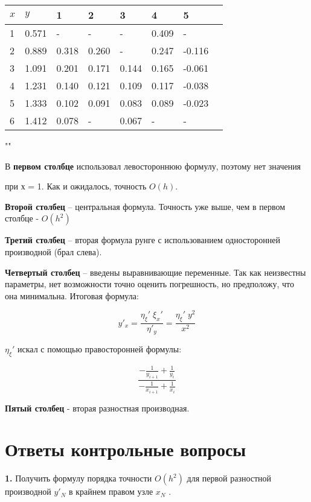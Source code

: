 \documentclass[a4paper,12pt]{article}
\begin{document}
\begin{center}
	\begin{tabular}{ | l | l | l | l | l | l | l | p{1cm} |}
		\hline
		$x$ & $y$ & 1 & 2 & 3 & 4 & 5 \\ \hline
		1 & 0.571 & -     & -     & -     & 0.409 & - \\ \hline
		2 & 0.889 & 0.318 & 0.260 & -     & 0.247 & -0.116 \\ \hline
		3 & 1.091 & 0.201 & 0.171 & 0.144 & 0.165 & -0.061 \\ \hline
		4 & 1.231 & 0.140 & 0.121 & 0.109 & 0.117 & -0.038 \\ \hline
		5 & 1.333 & 0.102 & 0.091 & 0.083 & 0.089 & -0.023 \\ \hline
		6 & 1.412 & 0.078 & -     & 0.067 & -     & - \\
		\hline
	\end{tabular}
\end{center}

""\newline

\noindent В \textbf{первом столбце} использовал левостороннюю формулу, поэтому нет значения 

\noindent при х = 1. Как и ожидалось, точность $O(h)$.

\noindent \textbf{Второй столбец} -- центральная формула. Точность уже выше, чем в первом столбце - $O(h^2)$

\noindent \textbf{Третий столбец} -- вторая формула рунге с использованием односторонней производной (брал слева).

\noindent \textbf{Четвертый столбец} -- введены выравнивающие переменные. Так как неизвестны параметры, нет возможности точно оценить погрешность, но предположу, что она  минимальна.  Итоговая формула: 

$$ y'_{x} = \frac{\eta_{\xi}'\;\xi_{x}'}{\eta'_{y}} = \frac{\eta_{\xi}'\;y^2}{x^2} $$

\noindent $\eta_{\xi}'$ искал с помощью правосторонней формулы: 

$$\frac{-\frac{1}{y_{i + 1}} + \frac{1}{y_{i}}}{-\frac{1}{x_{i + 1}} + \frac{1}{x_{i}}} $$

\noindent \textbf{Пятый столбец} - вторая разностная производная.

\section{Ответы контрольные вопросы}
\noindent\textbf{1.} Получить формулу порядка точности $O(h^2) $ для первой разностной производной $y'_{N}$ в крайнем правом узле $x_{N}$ .\newline
\end{document}
